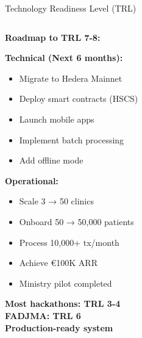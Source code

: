 \documentclass[aspectratio=169,xcolor=dvipsnames,14pt]{beamer}
\newcommand{\checkitem}{\item[\color{SuccessGreen}\faCheckCircle]}
\begin{document}
\begin{frame}{Technology Readiness Level (TRL)}
\begin{columns}[T]
    \begin{column}{0.5\textwidth}
      \textbf{Roadmap to TRL 7-8:}

      \textbf{Technical (Next 6 months):}
      \begin{itemize}
        \checkitem Migrate to Hedera Mainnet
        \checkitem Deploy smart contracts (HSCS)
        \checkitem Launch mobile apps
        \checkitem Implement batch processing
        \checkitem Add offline mode
      \end{itemize}

      \vspace{0.2cm}

      \textbf{Operational:}
      \begin{itemize}
        \checkitem Scale 3 → 50 clinics
        \checkitem Onboard 50 → 50,000 patients
        \checkitem Process 10,000+ tx/month
        \checkitem Achieve €100K ARR
        \checkitem Ministry pilot completed
      \end{itemize}

      \vspace{0.2cm}

      \begin{center}
        \textbf{Most hackathons: TRL 3-4} \\
        \textbf{FADJMA: TRL 6} \\
        \textcolor{SuccessGreen}{\textbf{Production-ready system}}
      \end{center}
    \end{column}
  \end{columns}

\end{frame}
\end{document}
